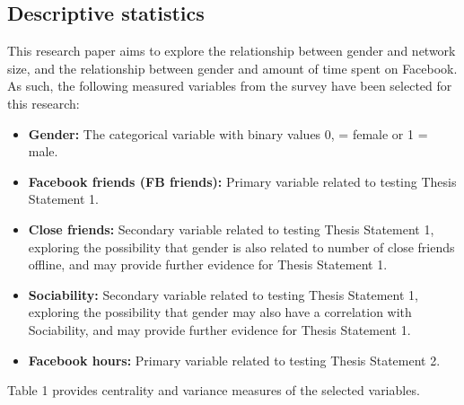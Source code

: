 
\subsection{Descriptive statistics}

This research paper aims to explore the relationship between gender and network size, and the relationship between gender and amount of time spent on Facebook. As such, the following measured variables from the survey have been selected for this research:\\

\begin{itemize}
\item \textbf{Gender:} The categorical variable with binary values 0, = female or 1 = male.
\item \textbf{Facebook friends (FB friends):} Primary variable related to testing Thesis Statement 1.
\item \textbf{Close friends:} Secondary variable related to testing Thesis Statement 1, exploring the possibility that gender is also related to number of close friends offline, and may provide further evidence for Thesis Statement 1.
\item \textbf{Sociability:} Secondary variable related to testing Thesis Statement 1, exploring the possibility that gender may also have a correlation with Sociability, and may provide further evidence for Thesis Statement 1.
\item \textbf{Facebook hours:} Primary variable related to testing Thesis Statement 2.
\end{itemize}

Table 1 provides centrality and variance measures of the selected variables.\\

